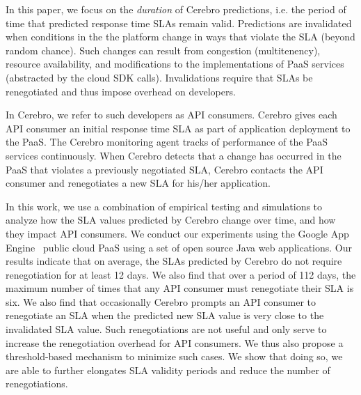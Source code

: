 In this paper, we focus on the \textit{duration} of Cerebro predictions, i.e. the period
of time that predicted response time SLAs remain valid.  Predictions are invalidated
when conditions in the the platform change in ways that violate the SLA (beyond random
chance).  Such changes can result from
congestion (multitenency), resource availability, and modifications to the implementations
of PaaS services (abstracted by the cloud SDK calls). Invalidations require that 
SLAs be renegotiated and thus impose overhead on developers.  

In Cerebro, we refer to such developers as API consumers.  Cerebro gives each API consumer an initial 
response time SLA as part of application deployment to the PaaS.
The Cerebro monitoring agent tracks of performance of the PaaS services continuously.
When Cerebro detects that a change has occurred in the PaaS that
violates a previously negotiated SLA, Cerebro contacts the API consumer and renegotiates 
a new SLA for his/her application.

In this work, we use a combination of empirical testing and simulations to analyze how 
the SLA values predicted by Cerebro change over time, and how they impact API consumers. We
conduct our experiments using the Google App Engine~\cite{gae} public cloud PaaS 
using a set of open source Java web applications. Our results indicate that on average, the
SLAs predicted by Cerebro do not require renegotiation for at least 12 days. We also find that
over a period of 112 days, the maximum number of times that any API consumer must renegotiate
their SLA is six.  We also find that occasionally Cerebro prompts an API consumer to
renegotiate an SLA when the predicted new SLA value is very close to the invalidated SLA value. 
Such renegotiations are not useful and only serve to increase the renegotiation overhead
for API consumers. We thus also propose a threshold-based mechanism to minimize such cases.  
We show that doing so, we are able to further elongates SLA validity periods and 
reduce the number of renegotiations.
